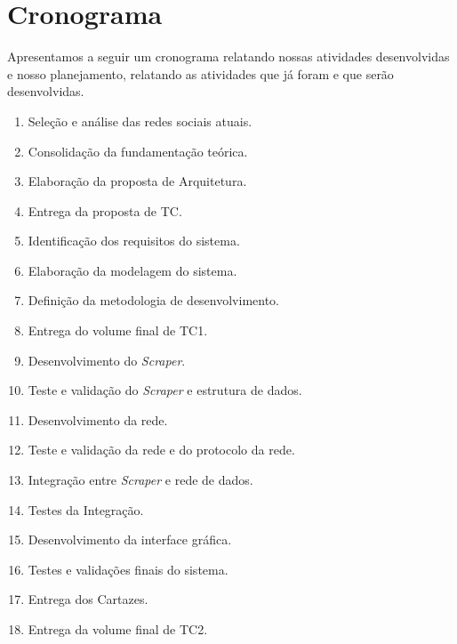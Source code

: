 \chapter{Cronograma}

Apresentamos a seguir um cronograma relatando nossas atividades desenvolvidas e nosso planejamento, relatando as atividades que já foram e que serão desenvolvidas.

\begin{enumerate}
    \item \label{cron:search} Seleção e análise das redes sociais atuais.
    \item \label{cron:background} Consolidação da fundamentação teórica.
    \item \label{cron:architecture} Elaboração da proposta de Arquitetura.
    \item \label{cron:proposal} Entrega da proposta de TC.
    \item \label{cron:requirements} Identificação dos requisitos do sistema.
    \item \label{cron:diagrams} Elaboração da modelagem do sistema.
    \item \label{cron:methodology} Definição da metodologia de desenvolvimento.
    \item \label{cron:esc-tcI}  Entrega do volume final de TC1.
    \item \label{cron:scraper} Desenvolvimento do \textit{Scraper}.
    \item \label{cron:val1}  Teste e validação do \textit{Scraper} e estrutura de dados.
    \item \label{cron:network} Desenvolvimento da rede.
    \item \label{cron:val2} Teste e validação da rede e do protocolo da rede.
    \item \label{cron:integration} Integração entre \textit{Scraper} e rede de dados.
    \item \label{cron:val3} Testes da Integração.
    \item \label{cron:gui} Desenvolvimento da interface gráfica.
    \item \label{cron:val4} Testes e validações finais do sistema.
    \item \label{cron:poster} Entrega dos Cartazes.
    \item \label{cron:esc-tcII} Entrega da volume final de TC2.
\end{enumerate}

